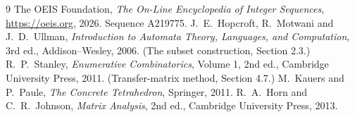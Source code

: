 \documentclass[11pt,a4paper]{article}
\theoremstyle{plain}
\theoremstyle{definition}
\begin{document}
\begin{thebibliography}{9}
 The OEIS Foundation, \emph{The On-Line Encyclopedia of Integer
Sequences}, \url{https://oeis.org}, 2026. Sequence A219775.
 J.~E.~Hopcroft, R.~Motwani and J.~D.~Ullman, \emph{Introduction to Automata
Theory, Languages, and Computation}, 3rd ed., Addison--Wesley, 2006. (The subset
construction, Section 2.3.)
 R.~P.~Stanley, \emph{Enumerative Combinatorics}, Volume 1, 2nd ed.,
Cambridge University Press, 2011. (Transfer-matrix method, Section 4.7.)
 M.~Kauers and P.~Paule, \emph{The Concrete Tetrahedron}, Springer, 2011.
 R.~A.~Horn and C.~R.~Johnson, \emph{Matrix Analysis}, 2nd ed., Cambridge
University Press, 2013.
\end{thebibliography}
\end{document}
